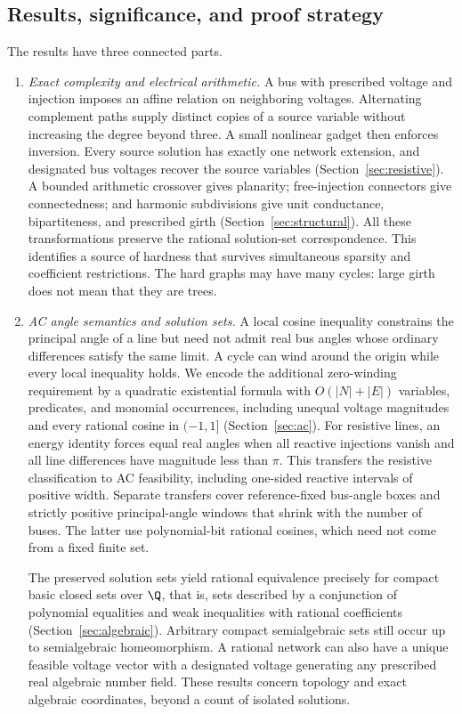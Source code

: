 \subsection{Results, significance, and proof strategy}

The results have three connected parts.

\begin{enumerate}
\item \emph{Exact complexity and electrical arithmetic.}
A bus with prescribed voltage and injection imposes an affine relation on
neighboring voltages.
Alternating complement paths supply distinct copies of a source variable
without increasing the degree beyond three. A small nonlinear gadget
then enforces inversion. Every source solution has exactly one network
extension, and designated bus voltages recover the source variables
(Section~\ref{sec:resistive}). A bounded arithmetic crossover gives
planarity; free-injection connectors give connectedness; and harmonic
subdivisions give unit conductance, bipartiteness, and prescribed girth
(Section~\ref{sec:structural}). All these transformations preserve the
rational solution-set correspondence. This identifies a source of hardness
that survives simultaneous sparsity and coefficient restrictions. The hard
graphs may have many cycles: large girth does not mean that they are trees.

\item \emph{AC angle semantics and solution sets.}
A local cosine inequality constrains the principal angle of a line but
need not admit real bus angles whose ordinary differences satisfy the same
limit. A cycle can wind around the origin while every local inequality
holds. We encode the additional zero-winding requirement by a quadratic
existential formula with $O(|N|+|E|)$ variables, predicates, and monomial
occurrences, including unequal voltage magnitudes and every rational cosine
in $(-1,1]$ (Section~\ref{sec:ac}). For resistive
lines, an energy identity forces equal real angles when all reactive
injections vanish and all line differences have magnitude less than $\pi$.
This transfers the resistive classification to AC feasibility, including
one-sided reactive intervals of positive width. Separate transfers cover
reference-fixed bus-angle boxes and strictly positive principal-angle
windows that shrink with the number of buses. The latter use
polynomial-bit rational cosines, which need not come from a fixed finite set.

The preserved solution sets yield rational equivalence precisely for compact
basic closed sets over $\Q$, that is, sets described by a conjunction of
polynomial equalities and weak inequalities with rational coefficients
(Section~\ref{sec:algebraic}). Arbitrary compact semialgebraic sets still
occur up to semialgebraic homeomorphism. A rational network can also have a
unique feasible voltage vector with a designated voltage generating any
prescribed real algebraic number field. These results concern topology and
exact algebraic coordinates, beyond a count of isolated solutions.


\end{enumerate}
